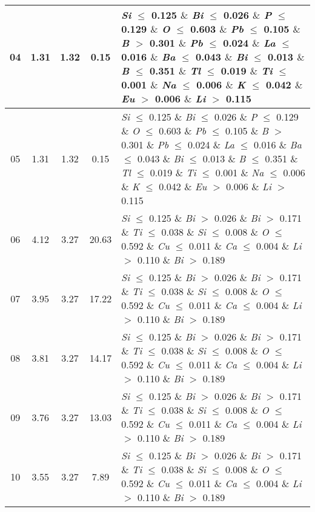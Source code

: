 \begin{table}[!htbp]
\begin{tabular}{ccccp{}}
		\hline
		04 & 1.31 & 1.32 & 0.15 & \textit{Si} $\le$ 0.125 $\&$ \textit{Bi} $\le$ 0.026 $\&$ \textit{P} $\le$ 0.129 $\&$ \textit{O} $\le$ 0.603 $\&$ \textit{Pb} $\le$ 0.105 $\&$ \textit{B} $>$ 0.301 $\&$ \textit{Pb} $\le$ 0.024 $\&$ \textit{La} $\le$ 0.016 $\&$ \textit{Ba} $\le$ 0.043 $\&$ \textit{Bi} $\le$ 0.013 $\&$ \textit{B} $\le$ 0.351 $\&$ \textit{Tl} $\le$ 0.019 $\&$ \textit{Ti} $\le$ 0.001 $\&$ \textit{Na} $\le$ 0.006 $\&$ \textit{K} $\le$ 0.042 $\&$ \textit{Eu} $>$ 0.006 $\&$ \textit{Li} $>$ 0.115\\
		\hline
		05 & 1.31 & 1.32 & 0.15 & \textit{Si} $\le$ 0.125 $\&$ \textit{Bi} $\le$ 0.026 $\&$ \textit{P} $\le$ 0.129 $\&$ \textit{O} $\le$ 0.603 $\&$ \textit{Pb} $\le$ 0.105 $\&$ \textit{B} $>$ 0.301 $\&$ \textit{Pb} $\le$ 0.024 $\&$ \textit{La} $\le$ 0.016 $\&$ \textit{Ba} $\le$ 0.043 $\&$ \textit{Bi} $\le$ 0.013 $\&$ \textit{B} $\le$ 0.351 $\&$ \textit{Tl} $\le$ 0.019 $\&$ \textit{Ti} $\le$ 0.001 $\&$ \textit{Na} $\le$ 0.006 $\&$ \textit{K} $\le$ 0.042 $\&$ \textit{Eu} $>$ 0.006 $\&$ \textit{Li} $>$ 0.115\\
		\hline
		06 & 4.12 & 3.27 & 20.63 & \textit{Si} $\le$ 0.125 $\&$ \textit{Bi} $>$ 0.026 $\&$ \textit{Bi} $>$ 0.171 $\&$ \textit{Ti} $\le$ 0.038 $\&$ \textit{Si} $\le$ 0.008 $\&$ \textit{O} $\le$ 0.592 $\&$ \textit{Cu} $\le$ 0.011 $\&$ \textit{Ca} $\le$ 0.004 $\&$ \textit{Li} $>$ 0.110 $\&$ \textit{Bi} $>$ 0.189\\
		\hline
		07 & 3.95 & 3.27 & 17.22 & \textit{Si} $\le$ 0.125 $\&$ \textit{Bi} $>$ 0.026 $\&$ \textit{Bi} $>$ 0.171 $\&$ \textit{Ti} $\le$ 0.038 $\&$ \textit{Si} $\le$ 0.008 $\&$ \textit{O} $\le$ 0.592 $\&$ \textit{Cu} $\le$ 0.011 $\&$ \textit{Ca} $\le$ 0.004 $\&$ \textit{Li} $>$ 0.110 $\&$ \textit{Bi} $>$ 0.189\\
		\hline
		08 & 3.81 & 3.27 & 14.17 & \textit{Si} $\le$ 0.125 $\&$ \textit{Bi} $>$ 0.026 $\&$ \textit{Bi} $>$ 0.171 $\&$ \textit{Ti} $\le$ 0.038 $\&$ \textit{Si} $\le$ 0.008 $\&$ \textit{O} $\le$ 0.592 $\&$ \textit{Cu} $\le$ 0.011 $\&$ \textit{Ca} $\le$ 0.004 $\&$ \textit{Li} $>$ 0.110 $\&$ \textit{Bi} $>$ 0.189\\
		\hline
		09 & 3.76 & 3.27 & 13.03 & \textit{Si} $\le$ 0.125 $\&$ \textit{Bi} $>$ 0.026 $\&$ \textit{Bi} $>$ 0.171 $\&$ \textit{Ti} $\le$ 0.038 $\&$ \textit{Si} $\le$ 0.008 $\&$ \textit{O} $\le$ 0.592 $\&$ \textit{Cu} $\le$ 0.011 $\&$ \textit{Ca} $\le$ 0.004 $\&$ \textit{Li} $>$ 0.110 $\&$ \textit{Bi} $>$ 0.189\\
		\hline
		10 & 3.55 & 3.27 & 7.89 & \textit{Si} $\le$ 0.125 $\&$ \textit{Bi} $>$ 0.026 $\&$ \textit{Bi} $>$ 0.171 $\&$ \textit{Ti} $\le$ 0.038 $\&$ \textit{Si} $\le$ 0.008 $\&$ \textit{O} $\le$ 0.592 $\&$ \textit{Cu} $\le$ 0.011 $\&$ \textit{Ca} $\le$ 0.004 $\&$ \textit{Li} $>$ 0.110 $\&$ \textit{Bi} $>$ 0.189\\

\end{tabular}
\end{table}
